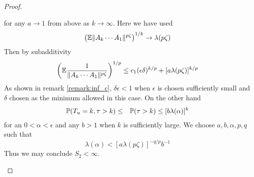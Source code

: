 \documentclass{article}
\theoremstyle{remark}
\begin{document}
\begin{proof}
\begin{enumerate}
        for any $a \to 1$ from above as $k \to \infty$. Here we have used
        \[
        \left(
          \E \|A_k \cdots A_1\|^{p \zeta}
        \right)^{1/k} \to \lambda(p\zeta)
        \]
        Then by subadditivity
        \[
        \left(
          \E {
            1 \over 
            \|A_k \cdots A_1\|^{p \zeta}
          }
        \right)^{1/p} \leq c_1 (\epsilon \delta)^{k/p} + [a \lambda(p\zeta)]^{k/p}
        \]
        As shown in remark \ref{remark:inf_c}, $\delta \epsilon < 1$
        when $\epsilon$ is chosen sufficiently small and $\delta$ chosen
        as the minimum allowed in this case. On the other hand
        \begin{eqnarray*}
          \P(T_u = k, \tau > k) &\leq& \P(\tau > k) \leq [b \lambda(\alpha)]^k
        \end{eqnarray*}
        for an $0 < \alpha < \epsilon$ and any $b > 1$ when $k$ is
        sufficiently large. We choose $a, b, \alpha, p, q$ such that
        \[
        \lambda(\alpha) < [a \lambda(p\zeta)]^{-q/p} b^{-1}
        \]
        Thus we may conclude $S_2 < \infty$.


\end{enumerate}
\end{proof}
\end{document}

